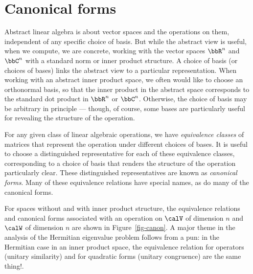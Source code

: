 \section{Canonical forms}

Abstract linear algebra is about vector spaces and the operations on
them, independent of any specific choice of basis.  But while the
abstract view is useful, when we compute, we  are concrete, working with
the vector spaces $\bbR^n$ and $\bbC^n$ with a standard norm or inner
product structure.  A choice of basis (or choices of bases) links the
abstract view to a particular representation.  When working with an
abstract inner product space, we often would like to choose an
orthonormal basis, so that the inner product in the abstract space
corresponds to the standard dot product in $\bbR^n$ or $\bbC^n$.
Otherwise, the choice of basis may be arbitrary in principle ---
though, of course, some bases are particularly useful for revealing
the structure of the operation.

For any given class of linear algebraic operations, we have
\emph{equivalence classes} of matrices that represent the operation
under different choices of bases.  It is useful
to choose a distinguished representative for each of these
equivalence classes, corresponding to a choice of basis that
renders the structure of the operation particularly clear.
These distinguished representatives are known as \emph{canonical forms}.
Many of these equivalence relations have special names, as do many of
the canonical forms.

For spaces without and with inner product structure, the equivalence relations
and canonical forms associated with an operation on $\calV$ of dimension
$n$ and $\calW$ of dimension $n$ are shown in Figure~\ref{fig-canon}.
A major theme in the analysis of the Hermitian eigenvalue problem follows
from a pun: in the Hermitian case in an inner product space,
the equivalence relation for operators (unitary similarity) and for
quadratic forms (unitary congruence) are the same thing!.

